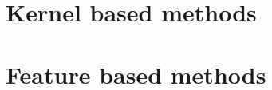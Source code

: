 \section{Kernel based methods} %


\section{Feature based methods}  %
\label{section1.3}

\section{}